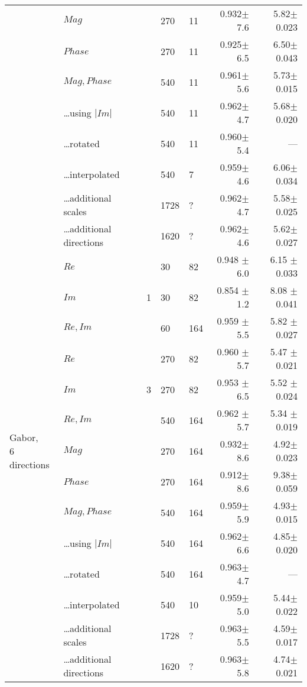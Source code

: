 \begin{tabularx}{\linewidth}{p{3cm} X X X X r r}
        & $Mag$                     &&    270   & 11    & 0.932$\pm$7.6     & 5.82$\pm$0.023 \\
        & $Phase$                   &&   270    & 11    & 0.925$\pm$6.5    & 6.50$\pm$0.043 \\
        & $Mag, Phase$              &&   540    & 11    & 0.961$\pm$5.6     & 5.73$\pm$0.015 \\
        & \ldots using $|Im|$       &&   540    & 11    & 0.962$\pm$4.7     & 5.68$\pm$0.020 \\
        & \ldots rotated            &&   540    & 11       & 0.960$\pm$5.4     & --- \\
        & \ldots interpolated       &&   540    &  7      & 0.959$\pm$4.6     & 6.06$\pm$0.034 \\
        & \ldots additional scales  &&  1728    &  ?      & 0.962$\pm$4.7     & 5.58$\pm$0.025 \\
        & \ldots additional directions&&  1620  &  ?    & 0.962$\pm$4.6     & 5.62$\pm$0.027 \\

\midrule
\multirow{13}{3cm}{Gabor, \newline 6 directions}
        & $Re$                  & \multirow{3}{1cm}{ 1 }
                                    &      30   & 82   & 0.948 $\pm$ 6.0   & 6.15 $\pm$ 0.033 \\
        & $Im$                      &&     30   & 82   & 0.854 $\pm$ 1.2   & 8.08 $\pm$ 0.041  \\
        & $Re,Im$                   &&     60   &164 & 0.959 $\pm$ 5.5   & 5.82 $\pm$ 0.027 \\
        & $Re$                  & \multirow{3}{1cm}{ 3 }
                                    &     270   & 82   & 0.960 $\pm$ 5.7   & 5.47 $\pm$ 0.021 \\
        & $Im$                      &&    270   & 82   & 0.953 $\pm$ 6.5   & 5.52 $\pm$ 0.024 \\
        & $Re,Im$                   &&    540   &164 & 0.962 $\pm$ 5.7   & 5.34 $\pm$ 0.019 \\
        & $Mag$                     &&    270   &164  & 0.932$\pm$8.6     & 4.92$\pm$ 0.023 \\
        & $Phase$                   &&   270    &164  & 0.912$\pm$8.6     & 9.38$\pm$ 0.059 \\
        & $Mag,Phase$               &&   540    &164  & 0.959$\pm$5.9     & 4.93$\pm$ 0.015 \\
        & \ldots using $|Im|$       &&   540    &164  & 0.962$\pm$6.6     & 4.85$\pm$ 0.020 \\
        & \ldots rotated            &&   540    &164   & 0.963$\pm$4.7     & --- \\
        & \ldots interpolated       &&   540    & 10      & 0.959$\pm$5.0     & 5.44$\pm$0.022 \\
        & \ldots additional scales  &&  1728    &?      & 0.963$\pm$5.5     & 4.59$\pm$0.017 \\
        & \ldots additional directions&&  1620  &?    & 0.963$\pm$5.8     & 4.74$\pm$0.021 \\


\end{tabularx}
